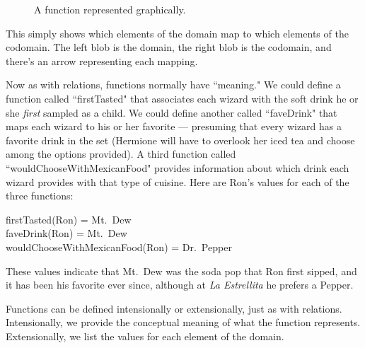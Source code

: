 \begin{figure}[ht]
\centering
\caption{A function represented graphically.}
\label{function}
\end{figure}

This simply shows which elements of the domain map to which elements of the
codomain. The left blob is the domain, the right blob is the codomain, and
there's an arrow representing each mapping.

Now as with relations, functions normally have ``meaning." We could define
a function called ``firstTasted" that associates each wizard with the soft
drink he or she \textit{first} sampled as a child. We could define another
called ``faveDrink" that maps each wizard to his or her favorite ---
presuming that every wizard has a favorite drink in the set (Hermione will
have to overlook her iced tea and choose among the options provided).  A
third function called ``wouldChooseWithMexicanFood" provides information
about which drink each wizard provides with that type of cuisine. Here are
Ron's values for each of the three functions:

\begin{center}
firstTasted(Ron) = Mt.~Dew \\
faveDrink(Ron) = Mt.~Dew \\
wouldChooseWithMexicanFood(Ron) = Dr.~Pepper
\end{center}

These values indicate that Mt.~Dew was the soda pop that Ron first sipped,
and it has been his favorite ever since, although at \textit{La Estrellita}
he prefers a Pepper.

Functions can be defined intensionally or extensionally, just as with
relations. Intensionally, we provide the conceptual meaning of what the
function represents. Extensionally, we list the values for each element of
the domain.

